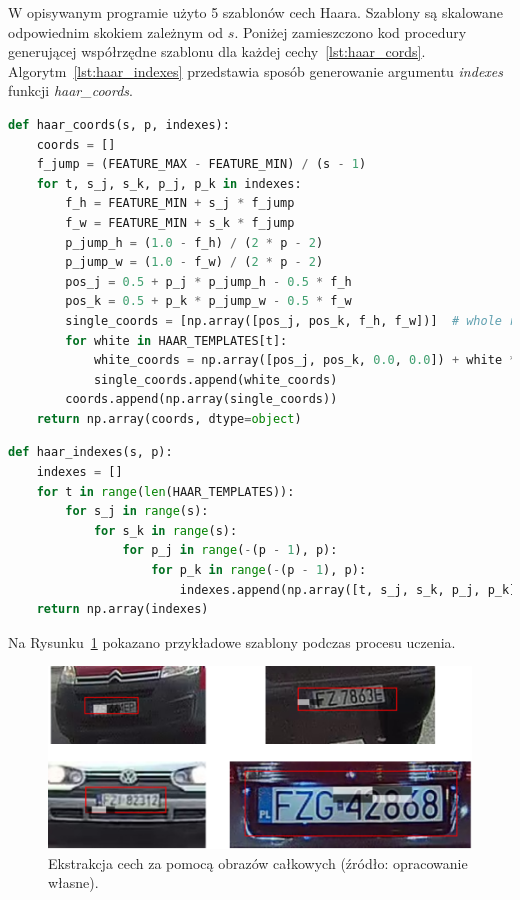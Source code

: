 W opisywanym programie użyto 5 szablonów cech Haara.
Szablony są skalowane odpowiednim skokiem zależnym od $s$.
Poniżej zamieszczono kod procedury generującej współrzędne szablonu dla każdej cechy~\ref{lst:haar_cords}.
Algorytm~\ref{lst:haar_indexes} przedstawia sposób generowanie argumentu \emph{indexes} funkcji \emph{haar\_coords}.
\begin{lstlisting}[language=Python, caption=Procedura generujące szablony cech Haara dla konkretnych wpsółrzędnych., label={lst:haar_cords}]
def haar_coords(s, p, indexes):
    coords = []
    f_jump = (FEATURE_MAX - FEATURE_MIN) / (s - 1)
    for t, s_j, s_k, p_j, p_k in indexes:
        f_h = FEATURE_MIN + s_j * f_jump
        f_w = FEATURE_MIN + s_k * f_jump
        p_jump_h = (1.0 - f_h) / (2 * p - 2)
        p_jump_w = (1.0 - f_w) / (2 * p - 2)
        pos_j = 0.5 + p_j * p_jump_h - 0.5 * f_h
        pos_k = 0.5 + p_k * p_jump_w - 0.5 * f_w
        single_coords = [np.array([pos_j, pos_k, f_h, f_w])]  # whole rectangle for single feature
        for white in HAAR_TEMPLATES[t]:
            white_coords = np.array([pos_j, pos_k, 0.0, 0.0]) + white * np.array([f_h, f_w, f_h, f_w])
            single_coords.append(white_coords)
        coords.append(np.array(single_coords))
    return np.array(coords, dtype=object)
\end{lstlisting}
\begin{minipage}{\linewidth}
    \begin{lstlisting}[language=Python, caption=Procedura generujące indeksy., label={lst:haar_indexes}]
def haar_indexes(s, p):
    indexes = []
    for t in range(len(HAAR_TEMPLATES)):
        for s_j in range(s):
            for s_k in range(s):
                for p_j in range(-(p - 1), p):
                    for p_k in range(-(p - 1), p):
                        indexes.append(np.array([t, s_j, s_k, p_j, p_k]))
    return np.array(indexes)
    \end{lstlisting}
\end{minipage}
Na Rysunku~\ref{fig:haar_feats_examples} pokazano przykładowe szablony podczas procesu uczenia.
\begin{figure}[!ht]
    \centering
    \includegraphics[scale=0.6]{Pictures/haar_tepmplates}
    \caption{Ekstrakcja cech za pomocą obrazów całkowych (źródło: opracowanie własne).}
    \label{fig:haar_feats_examples}
\end{figure}
\FloatBarrier

